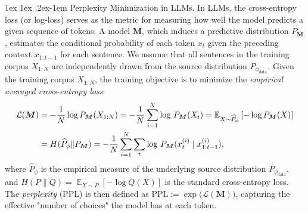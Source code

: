 \documentclass[11pt]{article}
\makeatletter
\theoremstyle{plain}
\theoremstyle{definition}
\renewcommand{\paragraph}{%
  \@startsection{paragraph}{4}%
  {\z@}{1ex \@plus 1ex \@minus .2ex}{-1em}%
  {\normalfont\normalsize\bfseries}%
}
\newcommand{\crossentropy}{H}
\newcommand{\source}{\phi}
\newcommand{\maxlength}{l_{\max}}
\newcommand{\Model}{\boldsymbol{M}}
\newcommand{\dataModel}{\phi_{\text{data}}}
\DeclareMathOperator*{\E}{\mathbb{E}}
\makeatother
\begin{document}
\paragraph{Perplexity Minimization in LLMs.}
In LLMs, the cross-entropy loss (or log-loss) serves as the metric for 
measuring how well the model predicts a given sequence of tokens. 
A model \( \Model \), which induces a predictive distribution \( P_{\Model} \), estimates the conditional probability of each token \( x_t \) given the preceding context \( x_{1:t-1} \) for each sentence.
We assume that all sentences in the training corpus $X_{1:N}$
are independently drawn from the source distribution $P_{\dataModel}$.
Given the training corpus $X_{1:N}$, the training objective is to minimize the \emph{empirical averaged cross-entropy loss}:
\begin{align}
\label{eq:perplexity_minimizatio}
    \mathcal{L}(\Model) 
     &   = -\frac{1}{N}\log P_{\Model}(X_{1:N}) =  - \frac{1}{N}
    \sum_{i=1}^N \log \, P_{\Model} (X_i) 
    = \mathbb{E}_{X\sim \widehat{P}_\phi}\left[-\log P_{\Model}(X)\right] \notag
    \\    & = \crossentropy(\widehat{P}_{\source} \| P_{\Model})
    =
    - \frac{1}{N}\sum_{i=1}^N \sum_{t}
    \log \, P_{\Model}(x_t^{(i)} \mid x^{(i)}_{1 : t-1}),
\end{align}
where $\widehat{P}_{\source}$ is the empirical measure of 
the underlying source distribution $P_{\dataModel}$,
and $\crossentropy(P\|Q) = \E_{X\sim P}[-\log Q(X)]$ 
is the standard cross-entropy loss.
The \emph{perplexity} (PPL) is then defined as 
\(\mathrm{PPL} := \exp\bigl(\mathcal{L}(\Model)\bigr)\), capturing the 
effective "number of choices" the model has at each token. 
\end{document}
